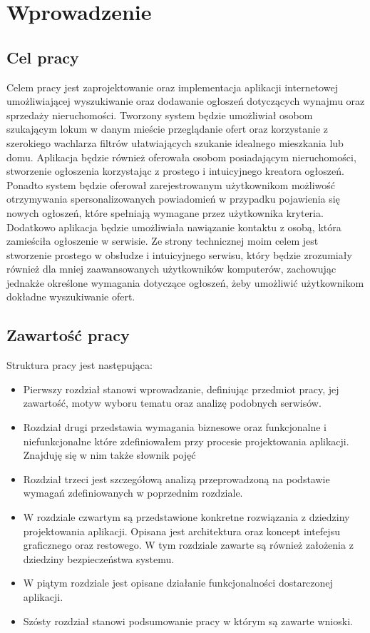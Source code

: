 \chapter{Wprowadzenie}
\label{cha:wprowadzenie}


\section{Cel pracy}
\label{sec:celPracy}
Celem pracy jest zaprojektowanie oraz implementacja aplikacji internetowej umożliwiającej wyszukiwanie oraz dodawanie ogłoszeń dotyczących wynajmu oraz sprzedaży nieruchomości. Tworzony system będzie umożliwiał osobom szukającym lokum w danym mieście przeglądanie ofert oraz korzystanie z szerokiego wachlarza filtrów ułatwiających szukanie idealnego mieszkania lub domu. Aplikacja będzie również oferowała osobom posiadającym nieruchomości, stworzenie ogłoszenia korzystając z prostego i intuicyjnego kreatora ogłoszeń. Ponadto system będzie oferował zarejestrowanym użytkownikom możliwość otrzymywania  spersonalizowanych powiadomień w przypadku pojawienia się nowych ogłoszeń, które spełniają wymagane przez użytkownika kryteria. Dodatkowo aplikacja będzie umożliwiała nawiązanie kontaktu z osobą, która zamieściła ogłoszenie w serwisie. Ze strony technicznej moim celem jest stworzenie prostego w obsłudze i intuicyjnego serwisu, który będzie zrozumiały również dla mniej zaawansowanych użytkowników komputerów, zachowując jednakże określone wymagania dotyczące ogłoszeń, żeby umożliwić użytkownikom dokładne wyszukiwanie ofert.


\section{Zawartość pracy}
\label{sec:zawartoscPracy}
Struktura pracy jest następująca:
\begin{itemize}
\item Pierwszy rozdział stanowi wprowadzanie, definiując przedmiot pracy, jej zawartość,  motyw wyboru tematu oraz analizę podobnych serwisów. 
\item Rozdział drugi przedstawia wymagania biznesowe oraz funkcjonalne i niefunkcjonalne które zdefiniowałem przy procesie projektowania aplikacji. Znajduję się w nim także słownik pojęć 
\item Rozdział trzeci jest szczegółową analizą przeprowadzoną na podstawie wymagań zdefiniowanych w poprzednim rozdziale. 
\item W rozdziale czwartym są przedstawione konkretne rozwiązania z dziedziny projektowania aplikacji. Opisana jest architektura oraz koncept intefejsu graficznego oraz restowego. W tym rozdziale zawarte są również założenia z dziedziny bezpieczeństwa systemu. 
\item W piątym rozdziale jest opisane działanie funkcjonalności dostarczonej aplikacji. 
\item Szósty rozdział stanowi podsumowanie pracy w którym są zawarte wnioski.
\end{itemize}

